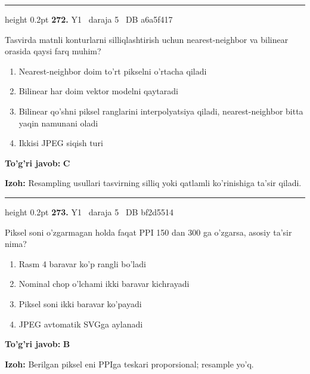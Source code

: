 \documentclass[10pt,a4paper,oneside]{article}
\begin{document}
\vspace{2mm}\hrule height 0.2pt \vspace{4mm}
\hypertarget{q272}{\textbf{\color{ink}272.}}  {\color{muted}\scriptsize Y1 \textbullet\ daraja 5 \textbullet\ DB a6a5f417}
\par
Tasvirda matnli konturlarni silliqlashtirish uchun nearest-neighbor va bilinear orasida qaysi farq muhim?
\begin{enumerate}[label=\Alph*),leftmargin=9mm]
\item Nearest-neighbor doim to'rt pikselni o'rtacha qiladi
\item Bilinear har doim vektor modelni qaytaradi
\item Bilinear qo'shni piksel ranglarini interpolyatsiya qiladi, nearest-neighbor bitta yaqin namunani oladi
\item Ikkisi JPEG siqish turi
\end{enumerate}
\begin{tcolorbox}[enhanced,breakable,colback=teal!4,colframe=teal!45!black,boxrule=0.45pt,arc=1.2mm,left=2.8mm,right=2.8mm,top=2mm,bottom=2mm,before skip=2mm,after skip=2mm]
\textbf{\color{teal}To'g'ri javob:} \textbf{C}
\par\smallskip
\textbf{Izoh:} Resampling usullari tasvirning silliq yoki qatlamli ko'rinishiga ta'sir qiladi.
\end{tcolorbox}
\vspace{2mm}\hrule height 0.2pt \vspace{4mm}
\hypertarget{q273}{\textbf{\color{ink}273.}}  {\color{muted}\scriptsize Y1 \textbullet\ daraja 5 \textbullet\ DB bf2d5514}
\par
Piksel soni o'zgarmagan holda faqat PPI 150 dan 300 ga o'zgarsa, asosiy ta'sir nima?
\begin{enumerate}[label=\Alph*),leftmargin=9mm]
\item Rasm 4 baravar ko'p rangli bo'ladi
\item Nominal chop o'lchami ikki baravar kichrayadi
\item Piksel soni ikki baravar ko'payadi
\item JPEG avtomatik SVGga aylanadi
\end{enumerate}
\begin{tcolorbox}[enhanced,breakable,colback=teal!4,colframe=teal!45!black,boxrule=0.45pt,arc=1.2mm,left=2.8mm,right=2.8mm,top=2mm,bottom=2mm,before skip=2mm,after skip=2mm]
\textbf{\color{teal}To'g'ri javob:} \textbf{B}
\par\smallskip
\textbf{Izoh:} Berilgan piksel eni PPIga teskari proporsional; resample yo'q.
\end{tcolorbox}
\end{document}
